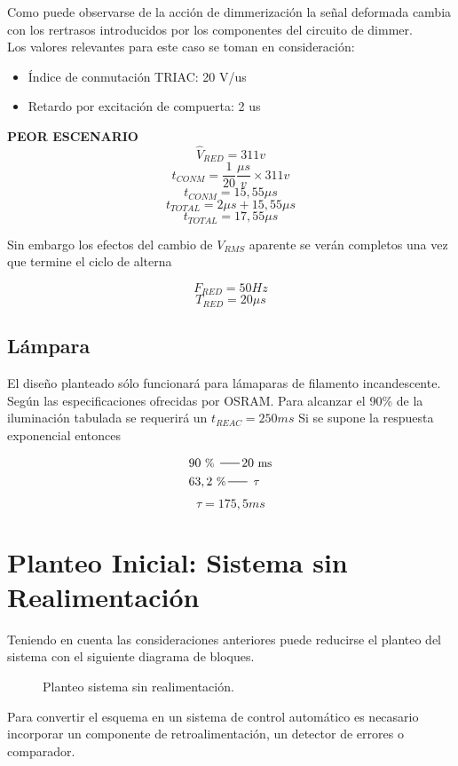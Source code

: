 \documentclass[a4paper,11pt]{article}
\begin{document}
 Como puede observarse de la acción de dimmerización la señal deformada cambia con los rertrasos introducidos por los componentes del circuito de dimmer.\\
 Los valores relevantes para este caso se toman en consideración:

\begin{itemize}
	\item Índice de conmutación TRIAC: 20 V/us
	\item Retardo por excitación de compuerta: 2 us
\end{itemize}

\textbf{PEOR ESCENARIO}
$$\widehat{V}_{RED} = 311v$$
$$t_{CONM} = \frac{1}{20}\frac{\mu s}{v}\times 311v$$
$$t_{CONM} = 15,55\mu s$$
$$t_{TOTAL} = 2\mu s + 15,55\mu s$$
$$t_{TOTAL} = 17,55\mu s$$

Sin embargo los efectos del cambio de $V_{RMS}$ aparente se verán completos una vez que termine el ciclo de alterna

$$F_{RED}=50Hz$$
$$T_{RED}=20\mu s$$

\subsection{Lámpara}
El diseño planteado sólo funcionará para lámaparas de filamento incandescente.
Según las especificaciones ofrecidas por OSRAM.
Para alcanzar el 90\% de la iluminación tabulada se requerirá un $t_{REAC}=250ms$
Si se supone la respuesta exponencial entonces 

\begin{align*}
& 90~\text{\small \% } \,\rule[2.5pt]{16pt}{0.5pt}\,
20~\text{\small ms}\\
& 63,2~\text{\small \%} \,\rule[2.5pt]{16pt}{0.5pt}\,
~\text{\small $\tau$}
\end{align*}
$$\tau = 175,5ms$$

\section{Planteo Inicial: Sistema sin Realimentación}
Teniendo en cuenta las consideraciones anteriores puede reducirse el planteo del sistema con el siguiente diagrama de bloques.

\begin{figure}[H] %
	\caption{Planteo sistema sin realimentación.}
	\label{fig:sistema_sin_retro}
\end{figure} 
Para convertir el esquema en un sistema de control automático es necasario incorporar un componente de retroalimentación, un detector de errores o comparador.
\end{document}
